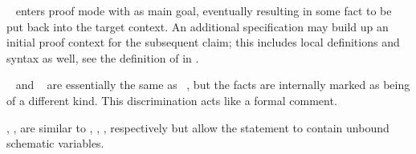 \begin{isabellebody}
\begin{isamarkuptext}
  \begin{description}
  
  \item \hyperlink{command.lemma}{\mbox{}}~ enters proof mode with
   as main goal, eventually resulting in some fact  to be put back into the target context.  An additional \hyperlink{syntax.context}{\mbox{}} specification may build up an initial proof context for the
  subsequent claim; this includes local definitions and syntax as
  well, see the definition of \hyperlink{syntax.context-elem}{\mbox{}} in
  .
  
  \item \hyperlink{command.theorem}{\mbox{}}~ and \hyperlink{command.corollary}{\mbox{}}~ are essentially the same as \hyperlink{command.lemma}{\mbox{}}~, but the facts are internally marked as
  being of a different kind.  This discrimination acts like a formal
  comment.

  \item \hyperlink{command.schematic-lemma}{\mbox{}}, \hyperlink{command.schematic-theorem}{\mbox{}},
  \hyperlink{command.schematic-corollary}{\mbox{}} are similar to \hyperlink{command.lemma}{\mbox{}},
  \hyperlink{command.theorem}{\mbox{}}, \hyperlink{command.corollary}{\mbox{}}, respectively but allow
  the statement to contain unbound schematic variables.


\end{description}
\end{isamarkuptext}
\end{isabellebody}
